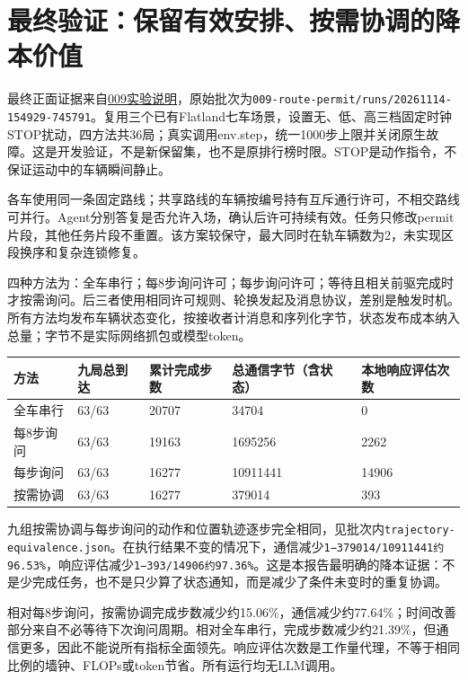 \hypertarget{ux6700ux7ec8ux9a8cux8bc1ux4fddux7559ux6709ux6548ux5b89ux6392ux6309ux9700ux534fux8c03ux7684ux964dux672cux4ef7ux503c}{%
\section{最终验证：保留有效安排、按需协调的降本价值}\label{ux6700ux7ec8ux9a8cux8bc1ux4fddux7559ux6709ux6548ux5b89ux6392ux6309ux9700ux534fux8c03ux7684ux964dux672cux4ef7ux503c}}

最终正面证据来自\href{../expr/009-route-permit/README.md}{009实验说明}，原始批次为\passthrough{\lstinline!009-route-permit/runs/20261114-154929-745791!}。复用三个已有Flatland七车场景，设置无、低、高三档固定时钟STOP扰动，四方法共36局；真实调用env.step，统一1000步上限并关闭原生故障。这是开发验证，不是新保留集，也不是原排行榜时限。STOP是动作指令，不保证运动中的车辆瞬间静止。

各车使用同一条固定路线；共享路线的车辆按编号持有互斥通行许可，不相交路线可并行。Agent分别答复是否允许入场，确认后许可持续有效。任务只修改permit片段，其他任务片段不重置。该方案较保守，最大同时在轨车辆数为2，未实现区段换序和复杂连锁修复。

四种方法为：全车串行；每8步询问许可；每步询问许可；等待且相关前驱完成时才按需询问。后三者使用相同许可规则、轮换发起及消息协议，差别是触发时机。所有方法均发布车辆状态变化，按接收者计消息和序列化字节，状态发布成本纳入总量；字节不是实际网络抓包或模型token。

\begin{longtable}[]{@{}lllll@{}}
\toprule
方法 & 九局总到达 & 累计完成步数 & 总通信字节（含状态） & 本地响应评估次数 \\
\midrule
\endhead
全车串行 & 63/63 & 20707 & 34704 & 0 \\
每8步询问 & 63/63 & 19163 & 1695256 & 2262 \\
每步询问 & 63/63 & 16277 & 10911441 & 14906 \\
按需协调 & 63/63 & 16277 & 379014 & 393 \\
\bottomrule
\end{longtable}

九组按需协调与每步询问的动作和位置轨迹逐步完全相同，见批次内\passthrough{\lstinline!trajectory-equivalence.json!}。在执行结果不变的情况下，通信减少\passthrough{\lstinline!1−379014/10911441约96.53\%!}，响应评估减少\passthrough{\lstinline!1−393/14906约97.36\%!}。这是本报告最明确的降本证据：不是少完成任务，也不是只少算了状态通知，而是减少了条件未变时的重复协调。

相对每8步询问，按需协调完成步数减少约15.06\%，通信减少约77.64\%；时间改善部分来自不必等待下次询问周期。相对全车串行，完成步数减少约21.39\%，但通信更多，因此不能说所有指标全面领先。响应评估次数是工作量代理，不等于相同比例的墙钟、FLOPs或token节省。所有运行均无LLM调用。

